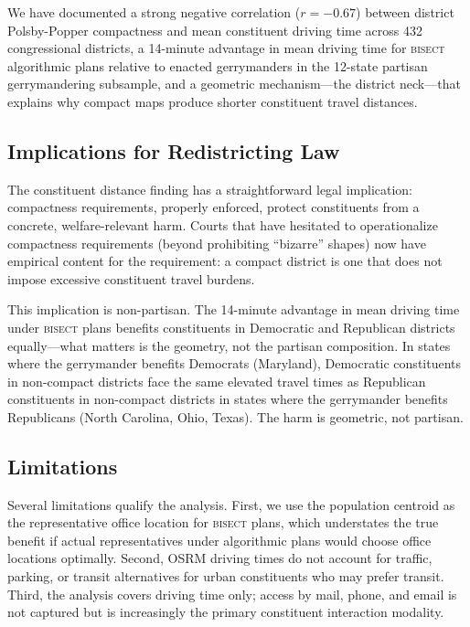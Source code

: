 \label{sec:conclusion}

We have documented a strong negative correlation ($r = -0.67$) between district
Polsby-Popper compactness and mean constituent driving time across 432 congressional
districts, a 14-minute advantage in mean driving time for \textsc{bisect} algorithmic
plans relative to enacted gerrymanders in the 12-state partisan gerrymandering subsample,
and a geometric mechanism---the district neck---that explains why compact maps produce
shorter constituent travel distances.

\subsection{Implications for Redistricting Law}

The constituent distance finding has a straightforward legal implication: compactness
requirements, properly enforced, protect constituents from a concrete, welfare-relevant
harm. Courts that have hesitated to operationalize compactness requirements (beyond
prohibiting ``bizarre'' shapes) now have empirical content for the requirement: a
compact district is one that does not impose excessive constituent travel burdens.

This implication is non-partisan. The 14-minute advantage in mean driving time under
\textsc{bisect} plans benefits constituents in Democratic and Republican districts
equally---what matters is the geometry, not the partisan composition. In states where
the gerrymander benefits Democrats (Maryland), Democratic constituents in non-compact
districts face the same elevated travel times as Republican constituents in non-compact
districts in states where the gerrymander benefits Republicans (North Carolina, Ohio,
Texas). The harm is geometric, not partisan.

\subsection{Limitations}

Several limitations qualify the analysis. First, we use the population centroid as the
representative office location for \textsc{bisect} plans, which understates the
true benefit if actual representatives under algorithmic plans would choose office
locations optimally. Second, OSRM driving times do not account for traffic,
parking, or transit alternatives for urban constituents who may prefer transit.
Third, the analysis covers driving time only; access by mail, phone, and email
is not captured but is increasingly the primary constituent interaction modality.

